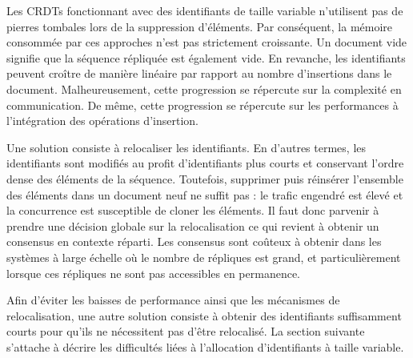 Les CRDTs fonctionnant avec des identifiants de taille variable n'utilisent pas
de pierres tombales lors de la suppression d'éléments. Par conséquent, la
mémoire consommée par ces approches n'est pas strictement croissante. Un
document vide signifie que la séquence répliquée est également vide. En
revanche, les identifiants peuvent croître de manière linéaire par rapport au
nombre d'insertions dans le document. Malheureusement, cette progression se
répercute sur la complexité en communication. De même, cette progression se
répercute sur les performances à l'intégration des opérations d'insertion.

Une solution consiste à relocaliser les identifiants. En d'autres termes, les
identifiants sont modifiés au profit d'identifiants plus courts et conservant
l'ordre dense des éléments de la séquence. Toutefois, supprimer puis réinsérer
l'ensemble des éléments dans un document neuf ne suffit pas : le trafic engendré
est élevé et la concurrence est susceptible de cloner les éléments. Il faut donc
parvenir à prendre une décision globale sur la relocalisation ce qui revient à
obtenir un consensus en contexte réparti. Les consensus sont coûteux à obtenir
dans les systèmes à large échelle où le nombre de répliques est grand, et
particulièrement lorsque ces répliques ne sont pas accessibles en permanence.

Afin d'éviter les baisses de performance ainsi que les mécanismes de
relocalisation, une autre solution consiste à obtenir des identifiants
suffisamment courts pour qu'ils ne nécessitent pas d'être relocalisé. La section
suivante s'attache à décrire les difficultés liées à l'allocation d'identifiants
à taille variable.

